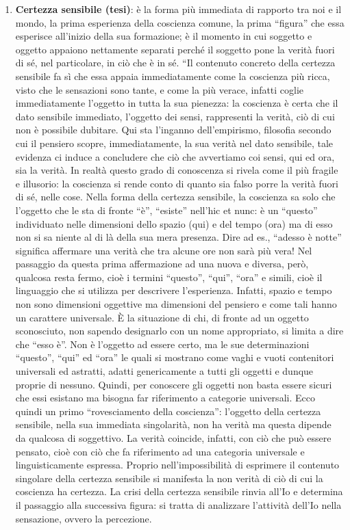 \documentclass[a4paper,12pt,oneside,openany]{book}%
\begin{document}
\begin{enumerate}
	\item \textbf{Certezza sensibile (tesi)}: è la forma più immediata di rapporto tra noi e il mondo, la prima esperienza della coscienza comune, la prima “figura” che essa esperisce all’inizio della sua formazione; è il momento in cui soggetto e oggetto appaiono nettamente separati perché il soggetto pone la verità fuori di sé, nel particolare, in ciò che è in sé. “Il contenuto concreto della certezza sensibile fa sì che essa appaia immediatamente come la coscienza più ricca, visto che le sensazioni sono tante, e come la più verace, infatti coglie immediatamente l’oggetto in tutta la sua pienezza: la coscienza è certa che il dato sensibile immediato, l’oggetto dei sensi, rappresenti la verità, ciò di cui non è possibile dubitare. Qui sta l’inganno dell’empirismo, filosofia secondo cui il pensiero scopre, immediatamente, la sua verità nel dato sensibile, tale evidenza ci induce a concludere che ciò che avvertiamo coi sensi, qui ed ora, sia la verità. In realtà questo grado di conoscenza si rivela come il più fragile e illusorio: la coscienza si rende conto di quanto sia falso porre la verità fuori di sé, nelle cose. Nella forma della certezza sensibile, la coscienza sa solo che l’oggetto che le sta di fronte “è”, “esiste” nell’hic et nunc: è un “questo” individuato nelle dimensioni dello spazio (qui) e del tempo (ora) ma di esso non si sa niente al di là della sua mera presenza. Dire ad es., “adesso è notte” significa affermare una verità che tra alcune ore non sarà più vera! Nel passaggio da questa prima affermazione ad una nuova e diversa, però, qualcosa resta fermo, cioè i termini “questo”, “qui”, “ora” e simili, cioè il linguaggio che si utilizza per descrivere l’esperienza. Infatti, spazio e tempo non sono dimensioni oggettive ma dimensioni del pensiero e come tali hanno un carattere universale. È la situazione di chi, di fronte ad un oggetto sconosciuto, non sapendo designarlo con un nome appropriato, si limita a dire che “esso è”. Non è l’oggetto ad essere certo, ma le sue determinazioni “questo”, “qui” ed “ora” le quali si mostrano come vaghi e vuoti contenitori universali ed astratti, adatti genericamente a tutti gli oggetti e dunque proprie di nessuno. Quindi, per conoscere gli oggetti non basta essere sicuri che essi esistano ma bisogna far riferimento a categorie universali. Ecco quindi un primo “rovesciamento della coscienza”: l’oggetto della certezza sensibile, nella sua immediata singolarità, non ha verità ma questa dipende da qualcosa di soggettivo. La verità coincide, infatti, con ciò che può essere pensato, cioè con ciò che fa riferimento ad una categoria universale e linguisticamente espressa. Proprio nell’impossibilità di esprimere il contenuto singolare della certezza sensibile si manifesta la non verità di ciò di cui la coscienza ha certezza. La crisi della certezza sensibile rinvia all’Io e determina il passaggio alla successiva figura: si tratta di analizzare l’attività dell’Io nella sensazione, ovvero la percezione.

\end{enumerate}
\end{document}
